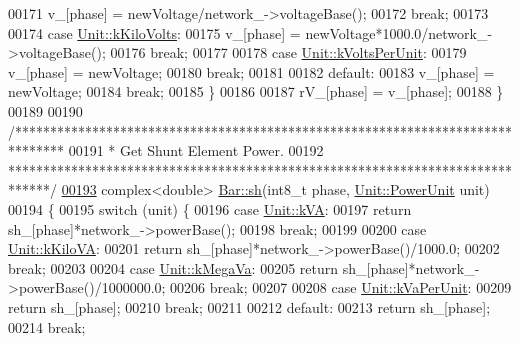 \begin{DoxyCode}
00171     v\_[phase] = newVoltage/network\_->voltageBase();
00172     \textcolor{keywordflow}{break};
00173 
00174   \textcolor{keywordflow}{case} \hyperlink{class_unit_a55b07dfa9457e1eca2c7194fe0cfc3c1a35a201a658c2cd89766787c657e9a54d}{Unit::kKiloVolts}:
00175     v\_[phase] = newVoltage*1000.0/network\_->voltageBase();
00176     \textcolor{keywordflow}{break};
00177 
00178   \textcolor{keywordflow}{case} \hyperlink{class_unit_a55b07dfa9457e1eca2c7194fe0cfc3c1ab44b1310b59fdcdc9df5bbea91da4206}{Unit::kVoltsPerUnit}:
00179     v\_[phase] = newVoltage;
00180     \textcolor{keywordflow}{break};
00181 
00182   \textcolor{keywordflow}{default}:
00183     v\_[phase] = newVoltage;
00184     \textcolor{keywordflow}{break};
00185   \}
00186 
00187   rV\_[phase] = v\_[phase];
00188 \}
00189 
00190 \textcolor{comment}{/*******************************************************************************}
00191 \textcolor{comment}{ * Get Shunt Element Power.}
00192 \textcolor{comment}{ ******************************************************************************/}
\hypertarget{bar_8cpp_source_l00193}{}\hyperlink{group___models_gac020fff2f22a9caab71f21205b5773f8}{00193} complex<double> \hyperlink{group___models_gac020fff2f22a9caab71f21205b5773f8}{Bar::sh}(int8\_t phase, \hyperlink{class_unit_ace265ae255370ccacfd5370337572c3b}{Unit::PowerUnit} unit)
00194 \{
00195   \textcolor{keywordflow}{switch} (unit) \{
00196   \textcolor{keywordflow}{case} \hyperlink{class_unit_ace265ae255370ccacfd5370337572c3ba72b181a842ae2759488a2fa1410d3696}{Unit::kVA}:
00197     \textcolor{keywordflow}{return} sh\_[phase]*network\_->powerBase();
00198     \textcolor{keywordflow}{break};
00199 
00200   \textcolor{keywordflow}{case} \hyperlink{class_unit_ace265ae255370ccacfd5370337572c3bac9e5154522fbb810d7aed75c3ff47cb2}{Unit::kKiloVA}:
00201     \textcolor{keywordflow}{return} sh\_[phase]*network\_->powerBase()/1000.0;
00202     \textcolor{keywordflow}{break};
00203 
00204   \textcolor{keywordflow}{case} \hyperlink{class_unit_ace265ae255370ccacfd5370337572c3ba6039da0ed20f8bee64305bab8bdec365}{Unit::kMegaVa}:
00205     \textcolor{keywordflow}{return} sh\_[phase]*network\_->powerBase()/1000000.0;
00206     \textcolor{keywordflow}{break};
00207 
00208   \textcolor{keywordflow}{case} \hyperlink{class_unit_ace265ae255370ccacfd5370337572c3bae056e80d620a87c61a44c359e6b05cc1}{Unit::kVaPerUnit}:
00209     \textcolor{keywordflow}{return} sh\_[phase];
00210     \textcolor{keywordflow}{break};
00211 
00212   \textcolor{keywordflow}{default}:
00213     \textcolor{keywordflow}{return} sh\_[phase];
00214     \textcolor{keywordflow}{break};

\end{DoxyCode}
